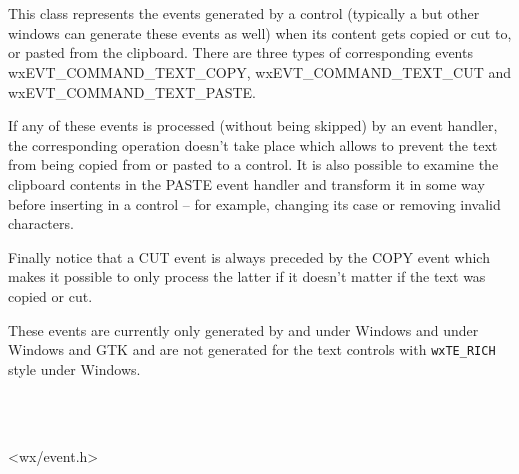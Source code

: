 
\section{}\label{wxclipboardtextevent}

This class represents the events generated by a control (typically a 
 but other windows can generate these events as
well) when its content gets copied or cut to, or pasted from the clipboard.
There are three types of corresponding events wxEVT\_COMMAND\_TEXT\_COPY,
wxEVT\_COMMAND\_TEXT\_CUT and wxEVT\_COMMAND\_TEXT\_PASTE.

If any of these events is processed (without being skipped) by an event
handler, the corresponding operation doesn't take place which allows to prevent
the text from being copied from or pasted to a control. It is also possible to
examine the clipboard contents in the PASTE event handler and transform it in
some way before inserting in a control -- for example, changing its case or
removing invalid characters.

Finally notice that a CUT event is always preceded by the COPY event which
makes it possible to only process the latter if it doesn't matter if the text
was copied or cut.


These events are currently only generated by  and
under Windows and  under Windows and GTK and
are not generated for the text controls with \texttt{wxTE\_RICH} style under
Windows.



\\
\\




<wx/event.h>

